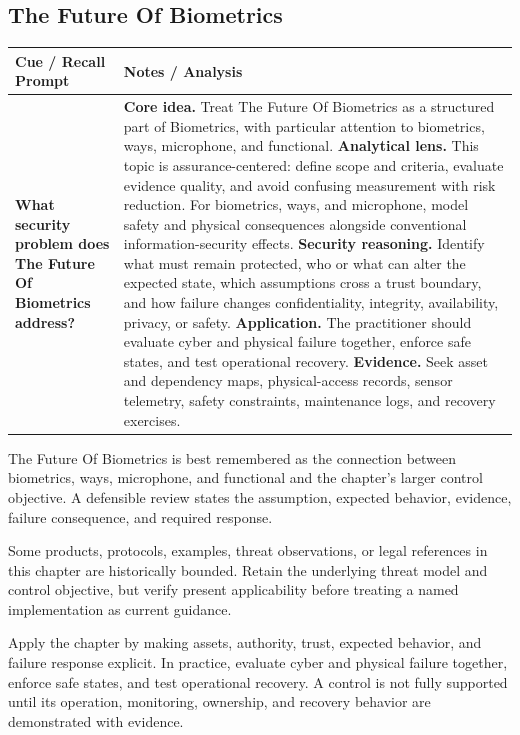 \documentclass[11pt]{article}
\newcommand{\CornellHeader}{%
\rowcolor{Navy}\color{white}\bfseries Cue / Recall Prompt & \color{white}\bfseries Notes / Analysis\\\hline}
\newcommand{\CornellRow}[2]{%
\cellcolor{CueGray}\RaggedRight\textbf{#1} & \RaggedRight #2\\\hline}
\begin{document}
\subsection*{The Future Of Biometrics}
\begin{longtable}{>{\RaggedRight\arraybackslash}p{}|>{\RaggedRight\arraybackslash}p{}}
\CornellHeader
\CornellRow{What security problem does The Future Of Biometrics address?}{\textbf{Core idea.} Treat The Future Of Biometrics as a structured part of Biometrics, with particular attention to biometrics, ways, microphone, and functional. \textbf{Analytical lens.} This topic is assurance-centered: define scope and criteria, evaluate evidence quality, and avoid confusing measurement with risk reduction. For biometrics, ways, and microphone, model safety and physical consequences alongside conventional information-security effects. \textbf{Security reasoning.} Identify what must remain protected, who or what can alter the expected state, which assumptions cross a trust boundary, and how failure changes confidentiality, integrity, availability, privacy, or safety. \textbf{Application.} The practitioner should evaluate cyber and physical failure together, enforce safe states, and test operational recovery. \textbf{Evidence.} Seek asset and dependency maps, physical-access records, sensor telemetry, safety constraints, maintenance logs, and recovery exercises.}
\end{longtable}
\begin{topicsummary}
The Future Of Biometrics is best remembered as the connection between biometrics, ways, microphone, and functional and the chapter's larger control objective. A defensible review states the assumption, expected behavior, evidence, failure consequence, and required response.
\end{topicsummary}
\begin{historybox}
Some products, protocols, examples, threat observations, or legal references in this chapter are historically bounded. Retain the underlying threat model and control objective, but verify present applicability before treating a named implementation as current guidance.
\end{historybox}
\begin{defensebox}
Apply the chapter by making assets, authority, trust, expected behavior, and failure response explicit. In practice, evaluate cyber and physical failure together, enforce safe states, and test operational recovery. A control is not fully supported until its operation, monitoring, ownership, and recovery behavior are demonstrated with evidence.
\end{defensebox}
\end{document}
